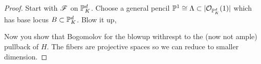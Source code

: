 \documentclass[12pt]{article}
\begin{document}
\begin{proof}
Start with $\F$ on $\P^d_K$. Choose a general pencil $\P^1 \cong \Lambda \subset |\struct{\P^d_K}(1)|$ which has base locus $B \subset \P^d_K$. Blow it up,
\begin{center}
\end{center}
Now you show that Bogomolov for the blowup withrespt to the (now not ample) pullback of $H$. The fibers are projective spaces so we can reduce to smaller dimension. 
\end{proof}
\end{document}
